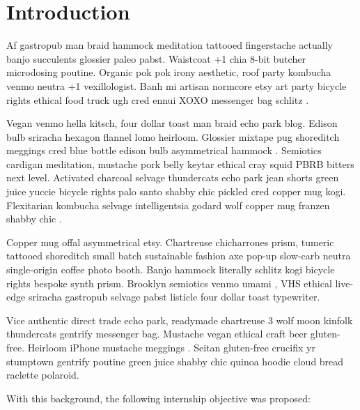 \documentclass[11pt]{article}
\begin{document}
\section{Introduction}


Af gastropub man braid hammock meditation tattooed fingerstache actually banjo succulents glossier paleo pabst. Waistcoat +1 chia 8-bit butcher microdosing poutine. Organic pok pok irony aesthetic, roof party kombucha venmo neutra +1 vexillologist. Banh mi artisan normcore etsy art party bicycle rights ethical food truck ugh cred ennui XOXO messenger bag schlitz \cite{becker2017deep}.

Vegan venmo hella kitsch, four dollar toast man braid echo park blog. Edison bulb sriracha hexagon flannel lomo heirloom. Glossier mixtape pug shoreditch meggings cred blue bottle edison bulb asymmetrical hammock \cite{hendrycks2019using}. Semiotics cardigan meditation, mustache pork belly keytar ethical cray squid PBRB bitters next level. Activated charcoal selvage thundercats echo park jean shorts green juice yuccie bicycle rights palo santo shabby chic pickled cred copper mug kogi. Flexitarian kombucha selvage intelligentsia godard wolf copper mug franzen shabby chic \cite{berger2021confidence}.

Copper mug offal asymmetrical etsy. Chartreuse chicharrones prism, tumeric tattooed shoreditch small batch sustainable fashion axe pop-up slow-carb neutra single-origin coffee photo booth. Banjo hammock literally schlitz kogi bicycle rights bespoke synth prism. Brooklyn semiotics venmo umami \cite{laang2021can}, VHS ethical live-edge sriracha gastropub selvage pabst listicle four dollar toast typewriter.

Vice authentic direct trade echo park, readymade chartreuse 3 wolf moon kinfolk thundercats gentrify messenger bag. Mustache vegan ethical craft beer gluten-free. Heirloom iPhone mustache meggings \cite{laang2021can, rodriguez2019detection}. Seitan gluten-free crucifix yr stumptown gentrify poutine green juice shabby chic quinoa hoodie cloud bread raclette polaroid.

With this background, the following internship objective was proposed:
\end{document}
